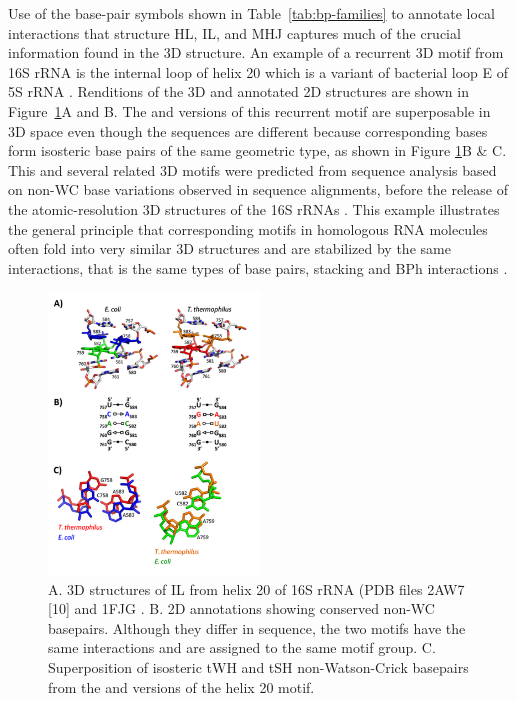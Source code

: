 Use of the base-pair symbols shown in Table~\ref{tab:bp-families} to annotate local interactions
that structure HL, IL, and MHJ captures much of the crucial information found in
the 3D structure. An example of a recurrent 3D motif from 16S rRNA is the
internal loop of helix 20 which is a variant of bacterial loop E of 5S rRNA
\cite{Leontis1998a}. Renditions of the 3D and annotated 2D structures are shown
in Figure~\ref{fig:compare-il}A and B. The \EC{} and \TT{} versions of this
recurrent motif are superposable in 3D space even though the sequences are
different because corresponding bases form isosteric base pairs of the same
geometric type, as shown in Figure \ref{fig:compare-il}B \& C. This and several
related 3D motifs were predicted from sequence analysis based on non-WC base
variations observed in sequence alignments, before the release of the
atomic-resolution 3D structures of the 16S rRNAs \cite{Leontis1998,
Leontis2002e}. This example illustrates the general principle that corresponding
motifs in homologous RNA molecules often fold into very similar 3D structures
and are stabilized by the same interactions, that is the same types of base
pairs, stacking and BPh interactions \cite{Petrov2013}.

\begin{figure}
  \includegraphics[width=0.5\textwidth]{chapter-1/figs/IL-20}
  \caption{A. 3D structures of IL from helix 20 of 16S rRNA (PDB files 2AW7 [10]
    and 1FJG \cite{Carter2000}. B. 2D annotations showing conserved non-WC basepairs.
    Although they differ in sequence, the two motifs have the same interactions
    and are assigned to the same motif group. C. Superposition of isosteric tWH
    and tSH non-Watson-Crick basepairs from the \EC{} and \TT{} versions of the
    helix 20 motif.}
  \label{fig:compare-il}
\end{figure}

